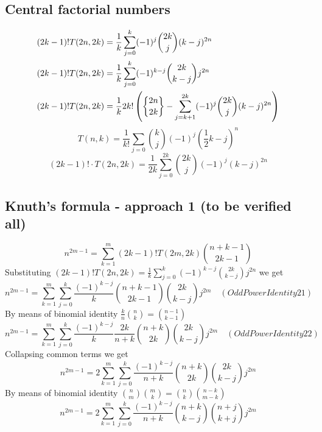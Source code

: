 \subsection{Central factorial numbers}\label{subsec:central-factorial-numbers}
\begin{align*}
(2k-1)!T(2n,2k) &= \frac{1}{k} \sum_{j=0}^{k} (-1)^j \binom{2k}{j} (k-j)^{2n} \\
(2k-1)! T(2n,2k) &= \frac{1}{k} \sum_{j=0}^{k} (-1)^{k-j} \binom{2k}{k-j} j^{2n} \\
(2k-1)! T(2n,2k) &= \frac{1}{k} 2k! \left( \stirlingii{2n}{2k} -  \sum_{j=k+1}^{2k} (-1)^j \binom{2k}{j} (k-j)^{2n}\right) \\
\end{align*}
\begin{equation*}
    T(n,k) = \frac{1}{k!} \sum_{j=0} \binom{k}{j} (-1)^{j} \left( \frac{1}{2}k - j \right)^{n}
\end{equation*}
\begin{equation*}
(2k-1)! \cdot T(2n, 2k) = \frac{1}{2k} \sum_{j=0}^{2k} \binom{2k}{j} (-1)^{j} (k-j)^{2n}
\end{equation*}

\subsection{Knuth's formula - approach 1 (to be verified all)}\label{subsec:knuth's-formula---approach-1-(to-be-verified-all)}
\begin{equation*}
    n^{2m-1} = \sum_{k=1}^{m} (2k-1)! T(2m,2k) \binom{n+k-1}{2k-1}
\end{equation*}
Substituting $(2k-1)! T(2n,2k) = \frac{1}{k} \sum_{j=0}^{k} (-1)^{k-j} \binom{2k}{k-j} j^{2n}$ we get
\begin{equation*}
    n^{2m-1} = \sum_{k=1}^{m} \sum_{j=0}^{k} \frac{(-1)^{k-j}}{k} \binom{n+k-1}{2k-1} \binom{2k}{k-j} j^{2m} \quad
    (OddPowerIdentity21)
\end{equation*}
By means of binomial identity $\frac{k}{n} \binom{n}{k} = \binom{n-1}{k-1}$
\begin{equation*}
    n^{2m-1} = \sum_{k=1}^{m} \sum_{j=0}^{k} \frac{(-1)^{k-j}}{k} \frac{2k}{n+k} \binom{n+k}{2k} \binom{2k}{k-j} j^{2m} \quad
    (OddPowerIdentity22)
\end{equation*}
Collapsing common terms we get
\begin{equation*}
    n^{2m-1} = 2\sum_{k=1}^{m} \sum_{j=0}^{k} \frac{(-1)^{k-j}}{n+k} \binom{n+k}{2k} \binom{2k}{k-j} j^{2m}
\end{equation*}
By means of binomial identity $\binom{n}{m} \binom{m}{k} = \binom{n}{k} \binom{n-k}{m-k}$
\begin{equation*}
    n^{2m-1} = 2\sum_{k=1}^{m} \sum_{j=0}^{k} \frac{(-1)^{k-j}}{n+k} \binom{n+k}{k-j} \binom{n+j}{k+j} j^{2m}
\end{equation*}

